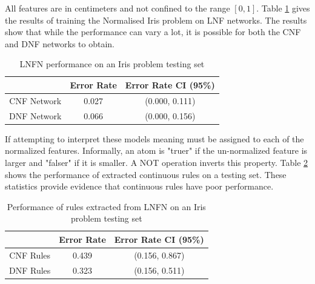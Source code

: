 \noindent
\begin{minipage}[t]{0.35\textwidth}
	All features are in centimeters and not confined to the range $[0, 1]$. Table \ref{tab:iris-network-peformance-comp} gives the results of training the Normalised Iris problem on LNF networks. The results show that while the performance can vary a lot, it is possible for both the CNF and DNF networks to obtain.\\
\end{minipage}
\hspace{0.05\textwidth}
\begin{minipage}[t]{0.50\textwidth}
	\begin{table}[H]
		\begin{center}
			\begin{tabular}{| c | c | c |}
				\hline
				& Error Rate & Error Rate CI (95\%) \\
				\hline
				\hline
				CNF Network & 0.027 & (0.000, 0.111) \\
				\hline
				DNF Network & 0.066 & (0.000, 0.156) \\
				\hline
			\end{tabular}
		\end{center}
		\caption{LNFN performance on an Iris problem testing set}
		\label{tab:iris-network-peformance-comp}
	\end{table}
\end{minipage}

If attempting to interpret these models meaning must be assigned to each of the normalized features. Informally, an atom is "truer" if the un-normalized feature is larger and "falser" if it is smaller. A NOT operation inverts this property. Table \ref{tab:iris-rule-peformance-comp} shows the performance of extracted continuous rules on a testing set. These statistics provide evidence that continuous rules have poor performance.

\begin{table}[H]
	\begin{center}
		\begin{tabular}{| c | c | c |}
			\hline
			& Error Rate & Error Rate CI (95\%) \\
			\hline
			\hline
			CNF Rules & 0.439 & (0.156, 0.867) \\
			\hline
			DNF Rules & 0.323 & (0.156, 0.511) \\
			\hline
		\end{tabular}
	\end{center}
	\caption{Performance of rules extracted from LNFN on an Iris problem testing set}
	\label{tab:iris-rule-peformance-comp}
\end{table}


